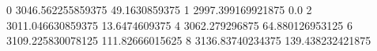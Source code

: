 0 3046.562255859375 49.1630859375
1 2997.399169921875 0.0
2 3011.046630859375 13.6474609375
4 3062.279296875 64.880126953125
6 3109.225830078125 111.82666015625
8 3136.83740234375 139.438232421875
